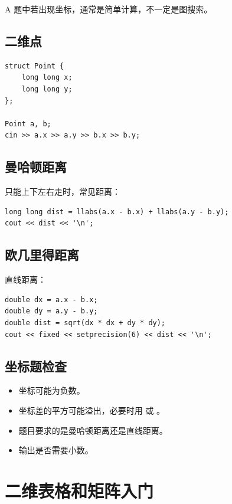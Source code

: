 A 题中若出现坐标，通常是简单计算，不一定是图搜索。

\subsection{二维点}

\begin{lstlisting}
struct Point {
    long long x;
    long long y;
};

Point a, b;
cin >> a.x >> a.y >> b.x >> b.y;
\end{lstlisting}

\subsection{曼哈顿距离}

只能上下左右走时，常见距离：

\begin{lstlisting}
long long dist = llabs(a.x - b.x) + llabs(a.y - b.y);
cout << dist << '\n';
\end{lstlisting}

\subsection{欧几里得距离}

直线距离：

\begin{lstlisting}
double dx = a.x - b.x;
double dy = a.y - b.y;
double dist = sqrt(dx * dx + dy * dy);
cout << fixed << setprecision(6) << dist << '\n';
\end{lstlisting}

\subsection{坐标题检查}

\begin{itemize}
  \item 坐标可能为负数。
  \item 坐标差的平方可能溢出，必要时用  或 。
  \item 题目要求的是曼哈顿距离还是直线距离。
  \item 输出是否需要小数。
\end{itemize}

\section{二维表格和矩阵入门}\label{sec:05-17}

